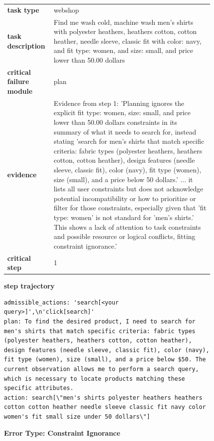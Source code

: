 \documentclass[../../main.tex]{subfiles}
\begin{document}
\begin{figure}[htbp]
\centering

\begin{tcolorbox}[
    title=\textbf{Error Type - Constraint Ignorance},
    colback=orange!1!white,
    colframe=orange!50!black,
    fonttitle=\bfseries,
    enhanced jigsaw,
    breakable
]
\small


\begin{tabularx}{\linewidth}{@{}lX@{}}
\textbf{task type} & webshop \\
\textbf{task description} & Find me wash cold, machine wash men's shirts with polyester heathers, heathers cotton, cotton heather, needle sleeve, classic fit with color: navy, and fit type: women, and size: small, and price lower than 50.00 dollars \\
\textbf{critical failure module} & plan \\
\textbf{evidence} & Evidence from step 1: 'Planning ignores the explicit fit type: women, size: small, and price lower than 50.00 dollars constraints in its summary of what it needs to search for, instead stating 'search for men's shirts that match specific criteria: fabric types (polyester heathers, heathers cotton, cotton heather), design features (needle sleeve, classic fit), color (navy), fit type (women), size (small), and a price below 50 dollars.' ... it lists all user constraints but does not acknowledge potential incompatibility or how to prioritize or filter for those constraints, especially given that 'fit type: women' is not standard for 'men's shirts.' This shows a lack of attention to task constraints and possible resource or logical conflicts, fitting constraint ignorance.' \\
\textbf{critical step} & 1 \\
\end{tabularx}

\medskip
\textbf{step trajectory}

\begin{Verbatim}[breaklines=true, breakanywhere=true]
admissible_actions: 'search[<your query>]',\n'click[search]'
plan: To find the desired product, I need to search for men's shirts that match specific criteria: fabric types (polyester heathers, heathers cotton, cotton heather), design features (needle sleeve, classic fit), color (navy), fit type (women), size (small), and a price below $50. The current observation allows me to perform a search query, which is necessary to locate products matching these specific attributes.
action: search[\"men's shirts polyester heathers heathers cotton cotton heather needle sleeve classic fit navy color women's fit small size under 50 dollars\"]
\end{Verbatim}


\end{tcolorbox}
\vspace{-1em}
\caption{\textbf{Error Type: Constraint Ignorance}}
\label{fig:error_constraint_ignorance}
\end{figure}
\end{document}
